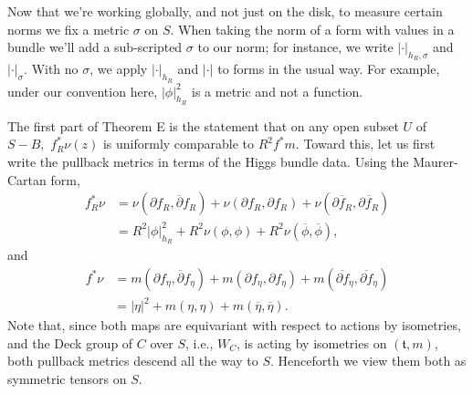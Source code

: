 \documentclass[10pt]{amsart}
\newcommand{\ft}{\mathfrak{t}}
\theoremstyle{definition}
\begin{document}
Now that we're working globally, and not just on the disk, to measure certain norms we fix a metric $\sigma$ on $S$. When taking the norm of a form with values in a bundle we'll add a sub-scripted $\sigma$ to our norm; for instance, we write $|\cdot|_{h_R,\sigma}$ and $|\cdot|_{\sigma}$. With no $\sigma$, we apply $|\cdot|_{h_R}$ and $|\cdot|$ to forms in the usual way. For example, under our convention here, $|\phi|_{h_R}^2$ is a metric and not a function.  

The first part of Theorem E is the statement that on any open subset $U$ of $S-B,$ $f_R^*\nu(z)$ is uniformly comparable to $R^2f^*m$. Toward this, let us first write the pullback metrics in terms of the Higgs bundle data. Using the Maurer-Cartan form,
\begin{align*}
    f_R^*\nu&=\nu(\partial f_R, \overline{\partial} f_R)+\nu( \partial f_R, \partial f_R) + \nu(\overline{\partial f_R}, \overline{ \partial f_R}) \\
&=R^2|\phi|_{h_R}^2+R^2\nu(\phi,\phi)+R^2\nu(\overline{\phi},\overline{\phi}),
\end{align*}
and 
\begin{align*}
    f^*\nu&=m(\partial f_\eta, \overline{\partial} f_\eta)+m( \partial f_\eta,  \partial f_\eta) + m(\overline{\partial f}_\eta, \overline{ \partial f}_\eta) \\
&=|\eta|^2+m(\eta,\eta)+m(\overline{\eta},\overline{\eta}).
\end{align*}
Note that, since both maps are equivariant with respect to actions by isometries, and the Deck group of $C$ over $S$, i.e., $W_C$, is acting by isometries on $(\ft,m)$, both pullback metrics descend all the way to $S$. Henceforth we view them both as symmetric tensors on $S$.
\end{document}

